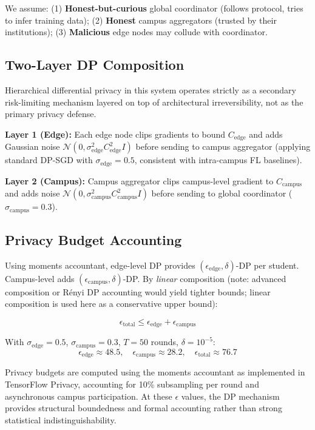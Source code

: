 \documentclass[conference]{IEEEtran}
\begin{document}
We assume: (1) \textbf{Honest-but-curious} global coordinator (follows protocol, tries to infer training data); (2) \textbf{Honest} campus aggregators (trusted by their institutions); (3) \textbf{Malicious} edge nodes may collude with coordinator.

\subsection{Two-Layer DP Composition}

Hierarchical differential privacy in this system operates strictly as a secondary risk-limiting mechanism layered on top of architectural irreversibility, not as the primary privacy defense.

\textbf{Layer 1 (Edge):} Each edge node clips gradients to bound $C_{\text{edge}}$ and adds Gaussian noise $\mathcal{N}(0, \sigma_{\text{edge}}^2 C_{\text{edge}}^2 I)$ before sending to campus aggregator (applying standard DP-SGD with $\sigma_{\text{edge}} = 0.5$, consistent with intra-campus FL baselines).

\textbf{Layer 2 (Campus):} Campus aggregator clips campus-level gradient to $C_{\text{campus}}$ and adds noise $\mathcal{N}(0, \sigma_{\text{campus}}^2 C_{\text{campus}}^2 I)$ before sending to global coordinator ($\sigma_{\text{campus}} = 0.3$).

\subsection{Privacy Budget Accounting}

Using moments accountant, edge-level DP provides $(\epsilon_{\text{edge}}, \delta)$-DP per student. Campus-level adds $(\epsilon_{\text{campus}}, \delta)$-DP. By \textit{linear} composition (note: advanced composition or R\'enyi DP accounting would yield tighter bounds; linear composition is used here as a conservative upper bound):

\begin{equation}
\epsilon_{\text{total}} \leq \epsilon_{\text{edge}} + \epsilon_{\text{campus}}
\end{equation}

With $\sigma_{\text{edge}} = 0.5$, $\sigma_{\text{campus}} = 0.3$, $T=50$ rounds, $\delta=10^{-5}$:
\[
\epsilon_{\text{edge}} \approx 48.5, \quad \epsilon_{\text{campus}} \approx 28.2, \quad \epsilon_{\text{total}} \approx 76.7
\]

Privacy budgets are computed using the moments accountant as implemented in TensorFlow Privacy, accounting for 10\% subsampling per round and asynchronous campus participation. At these $\epsilon$ values, the DP mechanism provides structural boundedness and formal accounting rather than strong statistical indistinguishability. 
\end{document}
